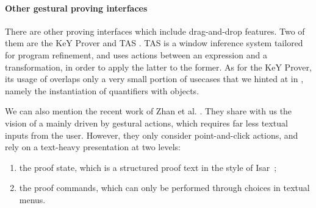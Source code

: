 

\paragraph{Other gestural proving interfaces}

There are other proving interfaces which include drag-and-drop features. Two of
them are the KeY Prover  and TAS
. TAS is a window inference system tailored for program
refinement, and uses  actions between an expression and a transformation, in
order to apply the latter to the former.
As for the KeY Prover, its usage of  overlaps only a very small
portion of usecases that we hinted at in , namely
the instantiation of quantifiers with objects.

We can also mention the recent work of Zhan et al. .
They share with us the vision of a  mainly driven by gestural
actions, which requires far less textual inputs from the user. However, they
only consider point-and-click actions, and rely on a text-heavy presentation at
two levels:
\begin{enumerate}
  \item the proof state, which is a structured proof text in the style of
  Isar~;
  \item the proof commands, which can only be performed through choices in
  textual menus.
\end{enumerate}

